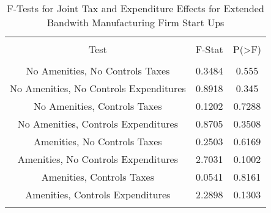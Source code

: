 
\begin{table}[!htbp] \centering 
  \caption{F-Tests for Joint Tax and Expenditure Effects for Extended Bandwith Manufacturing Firm Start Ups} 
  \label{31-33Ftests} 
\begin{tabular}{@{\extracolsep{5pt}} ccc} 
\\[-1.8ex]\hline 
\hline \\[-1.8ex] 
Test & F-Stat & P(\textgreater F) \\ 
\hline \\[-1.8ex] 
No Amenities, No Controls Taxes & 0.3484 & 0.555 \\ 
No Amenities, No Controls Expenditures & 0.8918 & 0.345 \\ 
No Amenities, Controls Taxes & 0.1202 & 0.7288 \\ 
No Amenities, Controls Expenditures & 0.8705 & 0.3508 \\ 
Amenities, No Controls Taxes & 0.2503 & 0.6169 \\ 
Amenities, No Controls Expenditures & 2.7031 & 0.1002 \\ 
Amenities, Controls Taxes & 0.0541 & 0.8161 \\ 
Amenities, Controls Expenditures & 2.2898 & 0.1303 \\ 
\hline \\[-1.8ex] 
\end{tabular} 
\end{table} 

